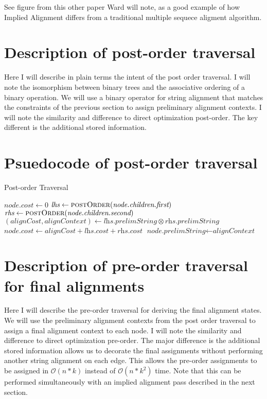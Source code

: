 \documentclass[11pt]{article}
\begin{document}
See figure from this other paper Ward will note, as a good example of how Implied Alignment differs from a traditional multiple sequece aligment algorithm.


\section{Description of post-order traversal}
Here I will describe in plain terms the intent of the post order traversal. I will note the isomorphism between binary trees and the associative ordering of a binary operation. 
We will use a binary operator for string alignment that  matches the constraints of the previous section to assign preliminary alignment contexts. 
I will note the similarity and difference to direct optimization post-order. 
The key different is the additional stored information.

\section{Psuedocode of post-order traversal}

\begin{algorithm}
  \caption{Post-order Traversal}\label{postOrder}
  \begin{algorithmic}[1]
        \State $\textit{node.cost} \gets 0$
      \Else
        \State $\textit{lhs}  \gets \Call{postOrder}{\textit{node.children.first}}$
        \State $\textit{rhs}  \gets \Call{postOrder}{\textit{node.children.second}}$
        \State $\left(\textit{alignCost}, \textit{alignContext}\right) \gets \textit{lhs.prelimString} \otimes \textit{rhs.prelimString}$
        \State $\textit{node.cost} \gets \textit{alignCost} + \textit{lhs.cost} + \textit{rhs.cost}$
        \State $\textit{node.prelimString} \gets \textit{alignContext}$
      \EndIf
    \EndFunction  
  \end{algorithmic}
\end{algorithm}


\section{Description of pre-order traversal for final alignments}
Here I will describe the pre-order traversal for deriving the final alignment states. 
We will use the preliminary alignment contexts from the post order traversal to assign a final alignment context to each node. 
I will note the similarity and difference to direct optimization pre-order. 
The major difference is the additional stored information allows us to decorate the final assignments without performing another string alignment on each edge.
This allows the pre-order assignments to be assigned in $\mathcal{O}(n*k)$ instead of $\mathcal{O}(n*k^2)$ time.
Note that this can be performed simultaneously with an implied alignment pass described in the next section.
\end{document}
